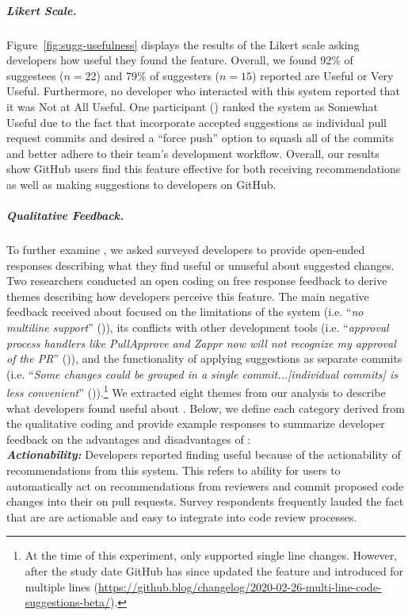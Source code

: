 \subparagraph{Likert Scale.} 

Figure~\ref{fig:sugg-usefulness} displays the results of the Likert scale asking developers how useful they found the \sugg feature. Overall, we found 92\% of suggestees ($n = 22$) and 79\% of suggesters ($n = 15$) reported \suggs are Useful or Very Useful. Furthermore, no developer who interacted with this system reported that it was Not at All Useful. One participant () ranked the system as Somewhat Useful due to the fact that \sugg incorporate accepted suggestions as individual pull request commits and desired a ``force push'' option to squash all of the commits and better adhere to their team's development workflow. Overall, our results show GitHub users find this feature effective for both receiving recommendations as well as making suggestions to developers on GitHub. 


\subparagraph{Qualitative Feedback.}

To further examine \suggs, we asked surveyed developers to provide open-ended responses describing what they find useful or unuseful about suggested changes. Two researchers conducted an open coding on free response feedback to derive themes describing how developers perceive this feature. The main negative feedback received about \sugg focused on the limitations of the system (i.e. ``\textit{no multiline support}'' ()), its conflicts with other development tools (i.e. ``\textit{approval process handlers like PullApprove and Zappr now will not recognize my approval of the PR}'' ()), and the functionality of applying suggestions as separate commits (i.e. ``\textit{Some changes could be grouped in a single commit...[individual commits] is less convenient}'' ()).\footnote{At the time of this experiment, \suggs only supported single line changes. However, after the study date GitHub has since updated the feature and introduced \sugg for multiple lines (\url{https://github.blog/changelog/2020-02-26-multi-line-code-suggestions-beta/}).} We extracted eight themes from our analysis to describe what developers found useful about \suggs. Below, we define each category derived from the qualitative coding and provide example responses to summarize developer feedback on the advantages and disadvantages of \sugg: \\

\textbf{\textit{Actionability:}} Developers reported finding \sugg useful because of the actionability of recommendations from this system. This refers to ability for users to automatically act on recommendations from reviewers and commit proposed code changes into their on pull requests. Survey respondents frequently lauded the fact that \sugg are are actionable and easy to integrate into code review processes.

